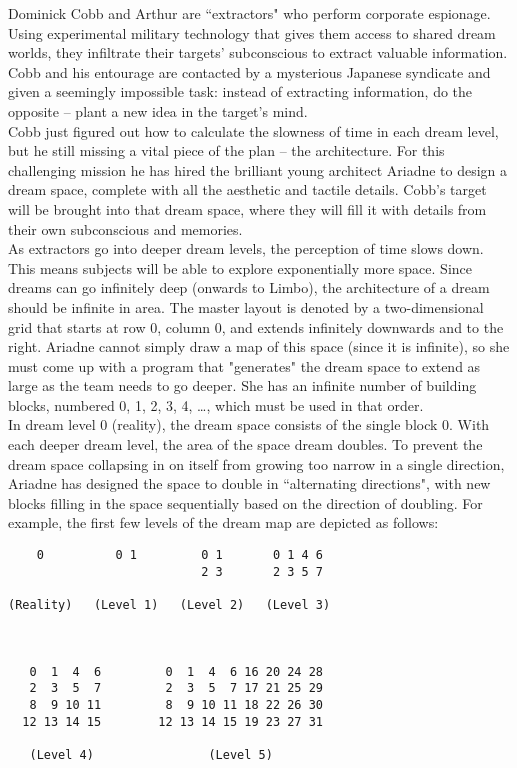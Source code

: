 
\noindent Dominick Cobb and Arthur are ``extractors" who perform corporate espionage. Using experimental military technology that gives them access to shared dream worlds, they infiltrate their targets' subconscious to extract valuable information. Cobb and his entourage are contacted by a mysterious Japanese syndicate and given a seemingly impossible task: instead of extracting information, do the opposite -- plant a new idea in the target's mind.\\

Cobb just figured out how to calculate the slowness of time in each dream level, but he still missing a vital piece of the plan -- the architecture. For this challenging mission he has hired the brilliant young architect Ariadne to design a dream space, complete with all the aesthetic and tactile details. Cobb's target will be brought into that dream space, where they will fill it with details from their own subconscious and memories.\\

As extractors go into deeper dream levels, the perception of time slows down. This means subjects will be able to explore exponentially more space. Since dreams can go infinitely deep (onwards to Limbo), the architecture of a dream should be infinite in area. The master layout is denoted by a two-dimensional grid that starts at row 0, column 0, and extends infinitely downwards and to the right. Ariadne cannot simply draw a map of this space (since it is infinite), so she must come up with a program that "generates" the dream space to extend as large as the team needs to go deeper. She has an infinite number of building blocks, numbered 0, 1, 2, 3, 4, \dots, which must be used in that order.\\

In dream level 0 (reality), the dream space consists of the single block 0. With each deeper dream level, the area of the space dream doubles. To prevent the dream space collapsing in on itself from growing too narrow in a single direction, Ariadne has designed the space to double in ``alternating directions", with new blocks filling in the space sequentially based on the direction of doubling. For example, the first few levels of the dream map are depicted as follows:\\

\centering
\begin{BVerbatim}
    0          0 1         0 1       0 1 4 6
                           2 3       2 3 5 7

(Reality)   (Level 1)   (Level 2)   (Level 3)



   0  1  4  6         0  1  4  6 16 20 24 28
   2  3  5  7         2  3  5  7 17 21 25 29
   8  9 10 11         8  9 10 11 18 22 26 30
  12 13 14 15        12 13 14 15 19 23 27 31

   (Level 4)                (Level 5)

\end{BVerbatim}

